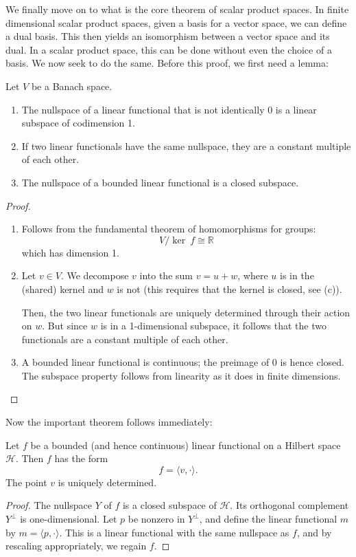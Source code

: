 \documentclass[twoside,symmetric, openany, 12pt]{./tuftebook}
\theoremstyle{definition}
\theoremstyle{definition}
\theoremstyle{definition}
\newenvironment{parts}{\begin{enumerate}[label=(\alph*)]}{\end{enumerate}}
\newcommand{\R}{\mathbb{R}}
\begin{document}
We finally move on to what is the core theorem of scalar product spaces. In finite dimensional scalar product spaces, given a basis for a vector space, we can define a dual basis. This then yields an isomorphism between a vector space and its dual. In a scalar product space, this can be done without even the choice of a basis. We now seek to do the same. Before this proof, we first need a lemma:
\begin{Lemma}
	Let $V$ be a Banach space.
	\begin{parts}
	\item The nullspace of a linear functional that is not identically 0 is a linear subspace of codimension 1.
	\item If two linear functionals have the same nullspace, they are a constant multiple of each other.
	\item The nullspace of a bounded linear functional is a closed subspace.
	\end{parts}
\end{Lemma}
\begin{proof}
	\begin{parts}
	\item Follows from the fundamental theorem of homomorphisms for groups:
		\[
		V / \ker~f \cong \R
		\]
		which has dimension 1.
	\item Let $v\in V$. We decompose $v$ into the sum $v = u + w$, where $u$ is in the (shared) kernel and $w$ is not (this requires that the kernel is closed, see (c)). 

		Then, the two linear functionals are uniquely determined through their action on $w$. But since $w$ is in a 1-dimensional subspace, it follows that the two functionals are a constant multiple of each other.
	\item A bounded linear functional is continuous; the preimage of $0$ is hence closed. The subspace property follows from linearity as it does in finite dimensions.\qedhere
	\end{parts}
\end{proof}
Now the important theorem follows immediately:
\begin{Theorem}
	Let $f$ be a bounded (and hence continuous) linear functional on a Hilbert space $\mathcal{H}$. Then $f$ has the form
	\[
	f = \langle v, \cdot\rangle
	.\] 
	The point $v$ is uniquely determined.
\end{Theorem}
\begin{proof}
The nullspace $Y$ of $f$ is a closed subspace of $\mathcal{H}$. Its orthogonal complement $Y^\perp$ is one-dimensional. Let $p$ be nonzero in $Y^\perp$, and define the linear functional $m$ by $m = \langle p, \cdot \rangle$. This is a linear functional with the same nullspace as $f$, and by rescaling appropriately, we regain $f$. 	
\end{proof}
\end{document}
